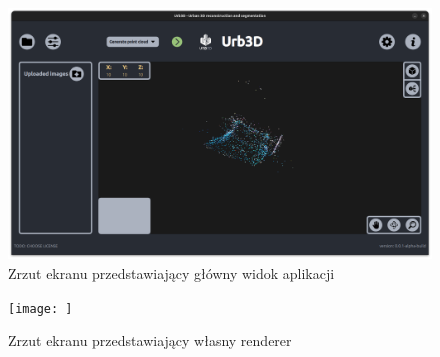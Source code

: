 \begin{figure}[h!]
    \centering
    \begin{minipage}{0.245\textwidth}
        \centering
        \includegraphics[width=\textwidth]{images/UI-Rendering.png}
    \end{minipage}
    \caption{Zrzut ekranu przedstawiający główny widok aplikacji}
    \label{fig:ui-rendering}
\end{figure}

\begin{figure}[h!]
    \centering
    \begin{minipage}{0.245\textwidth}
        \centering
        \texttt{[image: ]} %
    \end{minipage}
    \caption{Zrzut ekranu przedstawiający własny renderer}
    \label{fig:rendering}
\end{figure}